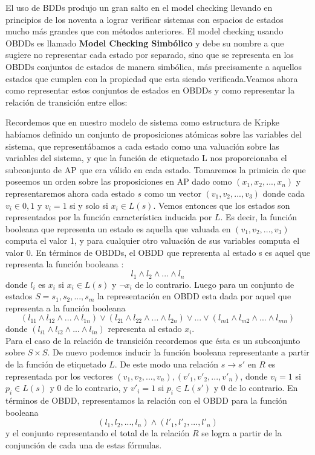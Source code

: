 \documentclass[titlepage, 12pt]{book}
\begin{document}
El uso de BDDs produjo un gran salto en el model checking llevando en principios de los noventa a lograr verificar sistemas con espacios de estados mucho m\'as grandes que con m\'etodos anteriores. El model checking usando OBDDs es llamado \textbf{Model Checking Simb\'olico} y debe su nombre a que sugiere no representar cada estado por separado, sino que se representa en los OBDDs conjuntos de estados de manera simb\'olica, m\'as precisamente a aquellos estados que cumplen con la propiedad que esta siendo verificada.Veamos ahora como representar estos conjuntos de estados en OBDDs y como representar la relaci\'on de transici\'on entre ellos:

Recordemos que en nuestro modelo de sistema como estructura de Kripke hab\'iamos definido un conjunto de proposiciones at\'omicas sobre las variables del sistema, que represent\'abamos a cada estado como una valuaci\'on sobre las variables del sistema, y que la funci\'on de etiquetado L nos proporcionaba el subconjunto de AP que era v\'alido en cada estado. Tomaremos la primicia de que poseemos un orden sobre las proposiciones en AP dado como $(x_1,x_2,...,x_n)$ y representaremos ahora cada estado $s$ como un vector $(v_1,v_2,...,v_3)$ donde cada $v_i \in {0,1}$ y $v_i = 1$ si y solo si $x_i \in L(s)$. Vemos entonces que los estados son representados por la funci\'on caracter\'istica inducida por $L$. Es decir, la funci\'on booleana que representa un estado es aquella que valuada en $(v_1,v_2,...,v_3)$ computa el valor 1, y para cualquier otro valuaci\'on de sus variables computa el valor 0. En t\'erminos de OBDDs, el OBDD que representa al estado s es aquel que representa la funci\'on booleana : $$l_1 \wedge l_2 \wedge ... \wedge l_n$$ donde $l_i$ es $x_i$ si $x_i \in L(s)$ y $\neg x_i$ de lo contrario. Luego para un conjunto de estados $S = {s_1, s_2, ..., s_m}$ la representaci\'on en OBDD esta dada por aquel que representa a la funci\'on booleana $$(l_{11} \wedge l_{12} \wedge ... \wedge l_{1n}) \vee (l_{21} \wedge l_{22} \wedge ... \wedge l_{2n}) \vee ... \vee (l_{m1} \wedge l_{m2} \wedge ... \wedge l_{mn})$$ donde $(l_{i1} \wedge l_{i2} \wedge ... \wedge l_{in})$ representa al estado $x_i$.\\

Para el caso de la relaci\'on de transici\'on recordemos que \'esta es un subconjunto sobre $S\times S$. De nuevo podemos inducir la funci\'on booleana representante a partir de la funci\'on de etiquetado $L$. De este modo una relaci\'on $s\rightarrow s'$ en $R$ es representada por los vectores $(v_1,v_2,...,v_n),(v'_1,v'_2,...,v'_n)$, donde $v_i = 1$ si $p_i \in L(s)$ y 0 de lo contrario, y $v'_i = 1$ si $p_i \in L(s')$ y 0 de lo contrario. En t\'erminos de OBDD, representamos la relaci\'on con el OBDD para la funci\'on booleana $$(l_1,l_2,...,l_n) \wedge (l'_1,l'_2,...,l'_n)$$ y el conjunto representando el total de la relaci\'on $R$ se logra a partir de la conjunci\'on de cada una de estas f\'ormulas.
\end{document}
